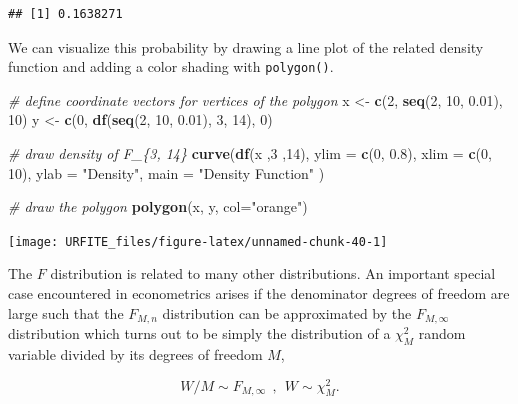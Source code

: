 \documentclass[]{book}
\newenvironment{Shaded}{\begin{snugshade}}{\end{snugshade}}
\newcommand{\KeywordTok}[1]{\textcolor[rgb]{0.13,0.29,0.53}{\textbf{#1}}}
\newcommand{\DataTypeTok}[1]{\textcolor[rgb]{0.13,0.29,0.53}{#1}}
\newcommand{\DecValTok}[1]{\textcolor[rgb]{0.00,0.00,0.81}{#1}}
\newcommand{\FloatTok}[1]{\textcolor[rgb]{0.00,0.00,0.81}{#1}}
\newcommand{\StringTok}[1]{\textcolor[rgb]{0.31,0.60,0.02}{#1}}
\newcommand{\CommentTok}[1]{\textcolor[rgb]{0.56,0.35,0.01}{\textit{#1}}}
\newcommand{\NormalTok}[1]{#1}
\theoremstyle{definition}
\theoremstyle{definition}
\theoremstyle{definition}
\theoremstyle{remark}
\begin{document}
\begin{verbatim}
## [1] 0.1638271
\end{verbatim}

We can visualize this probability by drawing a line plot of the related
density function and adding a color shading with \texttt{polygon()}.

\begin{Shaded}
\begin{Highlighting}[]
\CommentTok{# define coordinate vectors for vertices of the polygon}
\NormalTok{x <-}\StringTok{ }\KeywordTok{c}\NormalTok{(}\DecValTok{2}\NormalTok{, }\KeywordTok{seq}\NormalTok{(}\DecValTok{2}\NormalTok{, }\DecValTok{10}\NormalTok{, }\FloatTok{0.01}\NormalTok{), }\DecValTok{10}\NormalTok{)}
\NormalTok{y <-}\StringTok{ }\KeywordTok{c}\NormalTok{(}\DecValTok{0}\NormalTok{, }\KeywordTok{df}\NormalTok{(}\KeywordTok{seq}\NormalTok{(}\DecValTok{2}\NormalTok{, }\DecValTok{10}\NormalTok{, }\FloatTok{0.01}\NormalTok{), }\DecValTok{3}\NormalTok{, }\DecValTok{14}\NormalTok{), }\DecValTok{0}\NormalTok{)}

\CommentTok{# draw density of F_\{3, 14\}}
\KeywordTok{curve}\NormalTok{(}\KeywordTok{df}\NormalTok{(x ,}\DecValTok{3}\NormalTok{ ,}\DecValTok{14}\NormalTok{), }
      \DataTypeTok{ylim =} \KeywordTok{c}\NormalTok{(}\DecValTok{0}\NormalTok{, }\FloatTok{0.8}\NormalTok{), }
      \DataTypeTok{xlim =} \KeywordTok{c}\NormalTok{(}\DecValTok{0}\NormalTok{, }\DecValTok{10}\NormalTok{), }
      \DataTypeTok{ylab =} \StringTok{"Density"}\NormalTok{,}
      \DataTypeTok{main =} \StringTok{"Density Function"}
\NormalTok{      )}

\CommentTok{# draw the polygon}
\KeywordTok{polygon}\NormalTok{(x, y, }\DataTypeTok{col=}\StringTok{"orange"}\NormalTok{)}
\end{Highlighting}
\end{Shaded}

\begin{center}\texttt{[image: URFITE\_files/figure-latex/unnamed-chunk-40-1]} \end{center}

The \(F\) distribution is related to many other distributions. An
important special case encountered in econometrics arises if the
denominator degrees of freedom are large such that the \(F_{M,n}\)
distribution can be approximated by the \(F_{M,\infty}\) distribution
which turns out to be simply the distribution of a \(\chi^2_M\) random
variable divided by its degrees of freedom \(M\),

\[ W/M \sim F_{M,\infty} \ \ , \ \ W \sim \chi^2_M. \]
\end{document}
